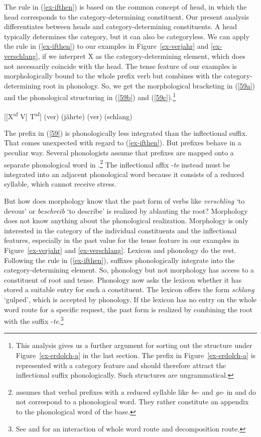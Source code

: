 \documentclass[output=paper
  ,nobabel
  ,draftmode
  ,colorlinks, citecolor=brown
]{langscibook}
\begin{document}
The rule in (\ref{ex-ifthen}) is based on the common concept of head, in which the head corresponds to the category-determining constituent. Our present analysis differentiates between heads and category-determining constituents. A head typically determines the category, but it can also be categoryless. We can apply the rule in (\ref{ex-ifthen}) to our examples in Figure~\ref{ex-verjahr} and \ref{ex-verschlang}, if we interpret X as the category-determining element, which does not necessarily coincide with the head. The tense feature of our examples is morphologically bound to the whole prefix verb but combines with the category-determining root in phonology. So, we get the morphological bracketing in (\ref{59a}) and the phonological structuring in (\ref{59b}) and (\ref{59c}).\footnote{This analysis gives us a further argument for sorting out the structure under Figure~\ref{ex-erdolch-a} in the last section. The prefix in Figure~\ref{ex-erdolch-a} is represented with a category feature and should therefore attract the inflectional suffix phonologically. Such structures are ungrammatical.}

\eal\label{59}
\ex\label{59a}
[[X\textsuperscript{af} V] T\textsuperscript{af}]
\ex\label{59b}
 (ver) (jährte)
 \ex\label{59c}
 (ver) (schlang)
\zl

\noindent The prefix in (\ref{59}) is phonologically less integrated than the inflectional suffix. That comes unexpected with regard to (\ref{ex-ifthen}). But prefixes behave in a peculiar way. Several phonologists assume that prefixes are mapped onto a separate phonological word in  \citep[cf.][Section~3.4]{Wiese1996}.\footnote{\citet{Booij1985} assumes that verbal prefixes with a reduced syllable like \emph{be}- and \emph{ge}- in  and  do not correspond to a phonological word. They rather constitute an appendix to the phonological word of the base.} The inflectional affix -\emph{te} instead must be integrated into an adjacent phonological word because it consists of a reduced syllable, which cannot receive stress.

But how does morphology know that the past form of verbs like \emph{verschling} `to devour' or \emph{beschreib} `to describe' is realized by ablauting the root? Morphology does not know anything about the phonological realization. Morphology is only interested in the category of the individual constituents and the inflectional features, especially in the past value for the tense feature in our examples in Figure~\ref{ex-verjahr} and \ref{ex-verschlang}. Lexicon and phonology do the rest. Following the rule in (\ref{ex-ifthen}), suffixes phonologically integrate into the category-determining element. So, phonology but not morphology has access to a constituent of root and tense.
Phonology now asks the lexicon whether it has stored a suitable entry for such a constituent. The lexicon offers the form \emph{schlang} `gulped', which is accepted by phonology. If the lexicon has no entry on the whole word route for a specific request, the past form is realized by combining the root with the suffix -\emph{te}.\footnote{See \citet{CaramazzaEtAl1988} and \citet{Plag2006} for an interaction of whole word route and decomposition route.}
\end{document}
